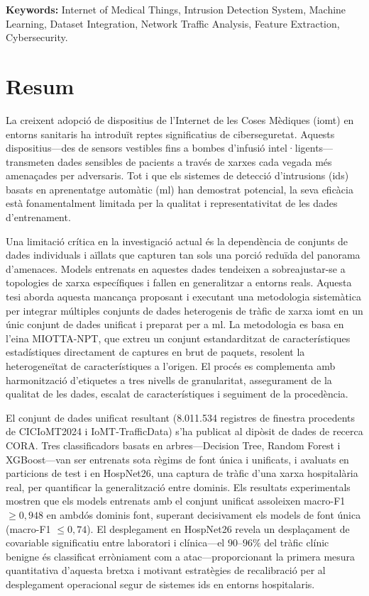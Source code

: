 \bigskip
\textbf{Keywords:} Internet of Medical Things, Intrusion Detection System, Machine Learning, Dataset Integration, Network Traffic Analysis, Feature Extraction, Cybersecurity.

\cleardoublepage

\chapter*{Resum}

La creixent adopció de dispositius de l'Internet de les Coses Mèdiques (\gls{iomt}) en entorns sanitaris ha introduït reptes significatius de ciberseguretat. Aquests dispositius---des de sensors vestibles fins a bombes d'infusió intel·ligents---transmeten dades sensibles de pacients a través de xarxes cada vegada més amenaçades per adversaris. Tot i que els sistemes de detecció d'intrusions (\gls{ids}) basats en aprenentatge automàtic (\gls{ml}) han demostrat potencial, la seva eficàcia està fonamentalment limitada per la qualitat i representativitat de les dades d'entrenament.

Una limitació crítica en la investigació actual és la dependència de conjunts de dades individuals i aïllats que capturen tan sols una porció reduïda del panorama d'amenaces. Models entrenats en aquestes dades tendeixen a sobreajustar-se a topologies de xarxa específiques i fallen en generalitzar a entorns reals. Aquesta tesi aborda aquesta mancança proposant i executant una metodologia sistemàtica per integrar múltiples conjunts de dades heterogenis de tràfic de xarxa \gls{iomt} en un únic conjunt de dades unificat i preparat per a \gls{ml}. La metodologia es basa en l'eina MIOTTA-NPT, que extreu un conjunt estandarditzat de característiques estadístiques directament de captures en brut de paquets, resolent la heterogeneïtat de característiques a l'origen. El procés es complementa amb harmonització d'etiquetes a tres nivells de granularitat, assegurament de la qualitat de les dades, escalat de característiques i seguiment de la procedència.

El conjunt de dades unificat resultant (8.011.534 registres de finestra procedents de CICIoMT2024 i IoMT-TrafficData) s'ha publicat al dipòsit de dades de recerca CORA. Tres classificadors basats en arbres---Decision Tree, Random Forest i XGBoost---van ser entrenats sota règims de font única i unificats, i avaluats en particions de test i en HospNet26, una captura de tràfic d'una xarxa hospitalària real, per quantificar la generalització entre dominis. Els resultats experimentals mostren que els models entrenats amb el conjunt unificat assoleixen macro-F1 $\geq 0{,}948$ en ambdós dominis font, superant decisivament els models de font única (macro-F1 $\leq 0{,}74$). El desplegament en HospNet26 revela un desplaçament de covariable significatiu entre laboratori i clínica---el $90$--$96\%$ del tràfic clínic benigne és classificat erròniament com a atac---proporcionant la primera mesura quantitativa d'aquesta bretxa i motivant estratègies de recalibració per al desplegament operacional segur de sistemes \gls{ids} en entorns hospitalaris.

